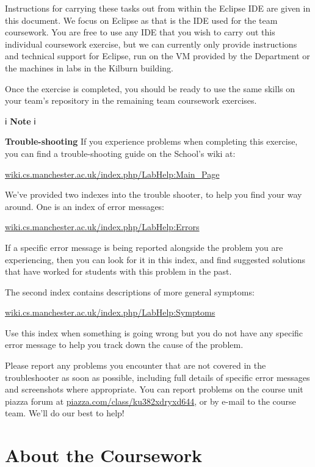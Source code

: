 \documentclass[
]{book}
\begin{document}
Instructions for carrying these tasks out from within the Eclipse IDE are given in this document. We focus on Eclipse as that is the IDE used for the team coursework. You are free to use any IDE that you wish to carry out this individual coursework exercise, but we can currently only provide instructions and technical support for Eclipse, run on the VM provided by the Department or the machines in labs in the Kilburn building.

Once the exercise is completed, you should be ready to use the same skills on your team's repository in the remaining team coursework exercises.

ℹ️ \textbf{Note} ℹ️

\textbf{Trouble-shooting} If you experience problems when completing this exercise, you can find a trouble-shooting guide on the School's wiki at:

\href{https://wiki.cs.manchester.ac.uk/index.php/LabHelp:Main_Page}{wiki.cs.manchester.ac.uk/index.php/LabHelp:Main\_Page}

We've provided two indexes into the trouble shooter, to help you find your way around. One is an index of error messages:

\href{https://wiki.cs.manchester.ac.uk/index.php/LabHelp:Errors}{wiki.cs.manchester.ac.uk/index.php/LabHelp:Errors}

If a specific error message is being reported alongside the problem you are experiencing, then you can look for it in this index, and find suggested solutions that have worked for students with this problem in the past.

The second index contains descriptions of more general symptoms:

\href{https://wiki.cs.manchester.ac.uk/index.php/LabHelp:Symptoms}{wiki.cs.manchester.ac.uk/index.php/LabHelp:Symptoms}

Use this index when something is going wrong but you do not have any specific error message to help you track down the cause of the problem.

Please report any problems you encounter that are not covered in the troubleshooter as soon as possible, including full details of specific error messages and screenshots where appropriate. You can report problems on the course unit piazza forum at \href{https://piazza.com/class/ku382xdryxd644}{piazza.com/class/ku382xdryxd644}, or by e-mail to the course team. We'll do our best to help!

\hypertarget{aboutcwk2}{%
\section{About the Coursework}\label{aboutcwk2}}
\end{document}
